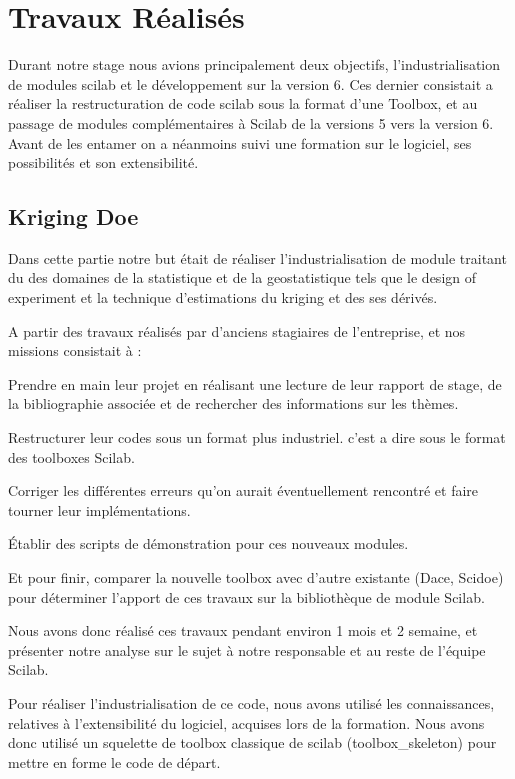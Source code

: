 \section*{Travaux Réalisés}

Durant notre stage nous avions principalement deux objectifs, l’industrialisation
de modules scilab et le développement sur la version 6.
Ces dernier consistait a réaliser la restructuration de code scilab sous
la format d’une Toolbox,
et au passage de modules complémentaires à Scilab de la versions 5 vers la version 6.
Avant de les entamer on a néanmoins suivi une formation sur le logiciel,
ses possibilités et son extensibilité.

\subsection*{Kriging Doe}

Dans cette partie notre but était de réaliser l’industrialisation de module
traitant du des domaines de la statistique et de la geostatistique tels que
le design of experiment et la technique d’estimations du kriging et des ses dérivés.

A partir des travaux réalisés par d’anciens stagiaires de l’entreprise,
et nos missions consistait à :

Prendre en main leur projet en réalisant une lecture de leur rapport de stage,
de la bibliographie associée et de rechercher des informations sur les thèmes.

Restructurer leur codes sous un format plus industriel.
c’est a dire sous le format des toolboxes Scilab.

Corriger les différentes erreurs qu’on aurait éventuellement rencontré
et faire tourner leur implémentations.

Établir des scripts de démonstration pour ces nouveaux modules.

Et pour finir, comparer la nouvelle toolbox avec d’autre existante (Dace, Scidoe)
pour déterminer l’apport de ces travaux sur la bibliothèque de module Scilab.

Nous avons donc réalisé ces travaux pendant environ 1 mois et 2 semaine,
et présenter notre analyse sur le sujet à notre responsable et au reste de l’équipe Scilab.

Pour réaliser l’industrialisation de ce code, nous avons utilisé les connaissances,
relatives à l’extensibilité du logiciel, acquises lors de la formation.
Nous avons donc utilisé un squelette de toolbox classique de scilab (toolbox\_skeleton)
pour mettre en forme le code de départ.

